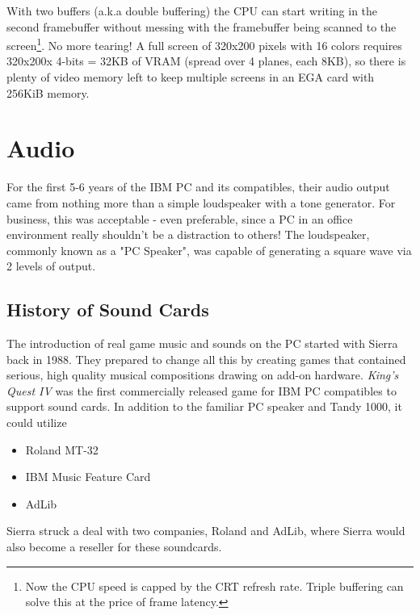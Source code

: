 \documentclass[book.tex]{subfiles}
\begin{document}
\par
With two buffers (a.k.a double buffering) the CPU can start writing in the second framebuffer without messing with the framebuffer being scanned to the screen\footnote{Now the CPU speed is capped by the CRT refresh rate. Triple buffering can solve this at the price of frame latency.}. No more tearing! A full screen of 320x200 pixels with 16 colors requires 320x200x 4-bits = 32KB of VRAM (spread over 4 planes, each 8KB), so there is plenty of video memory left to keep multiple screens in an EGA card with 256KiB memory.


\section{Audio}
\label{hardware-audio}
For the first 5-6 years of the IBM PC and its compatibles, their audio output came from nothing more than a simple loudspeaker with a tone generator. For business, this was acceptable - even preferable, since a PC in an office environment really shouldn't be a distraction to others! The loudspeaker, commonly known as a "PC Speaker", was capable of generating a square wave via 2 levels of output.\\
\begin{figure}[H]

\centering

\end{figure}


\subsection{History of Sound Cards}
The introduction of real game music and sounds on the PC started with Sierra back in 1988. They prepared to change all this by creating games that contained serious, high quality musical compositions drawing on add-on hardware. \textit{King's Quest IV} was the first commercially released game for IBM PC compatibles to support sound cards. In addition to the familiar PC speaker and Tandy 1000, it could utilize 
\begin{itemize}
    \item Roland MT-32
    \item IBM Music Feature Card
    \item AdLib
\end{itemize}
 
Sierra struck a deal with two companies, Roland and AdLib, where Sierra would also become a reseller for these soundcards. \\
\end{document}
